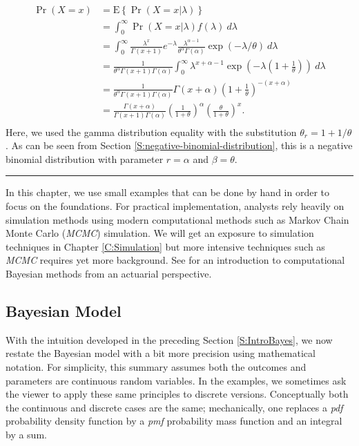 \documentclass[]{book}
\theoremstyle{definition}
\theoremstyle{definition}
\theoremstyle{definition}
\theoremstyle{remark}
\begin{document}
\[
\begin{aligned}
\Pr(X = x) 
&=  \mathrm{E} \left\{\Pr(X = x|\lambda)\right\}\\
&=  \int_0^{\infty} \Pr(X = x|\lambda) f(\lambda) ~d\lambda \\
&=  \int_0^{\infty} \frac{\lambda^x}{\Gamma(x+1)} e^{-\lambda} \frac{\lambda^{\alpha-1}}{\theta^{\alpha}\Gamma(\alpha)}\exp(-\lambda/\theta) ~d\lambda\\
&=  \frac{1}{\theta^{\alpha}\Gamma(x+1)\Gamma(\alpha)} \int_0^{\infty} \lambda^{x+\alpha-1} \exp\left(-\lambda(1+\frac{1}{\theta})\right) ~d\lambda \\
&=  \frac{1}{\theta^{\alpha}\Gamma(x+1)\Gamma(\alpha)} \Gamma(x+\alpha)\left(1+\frac{1}{\theta}\right)^{-(x+\alpha)} \\
&=  \frac{\Gamma(x+\alpha)}{\Gamma(x+1)\Gamma(\alpha)}\left(\frac{1}{1+\theta}\right)^{\alpha} \left(\frac{\theta}{1+\theta}\right)^{x} .\\
\end{aligned} 
\] Here, we used the gamma distribution equality with the substitution
\(\theta_r = 1 + 1/\theta\). As can be seen from Section
\ref{S:negative-binomial-distribution}, this is a negative binomial
distribution with parameter \(r = \alpha\) and \(\beta = \theta\).

\begin{center}\rule{0.5\linewidth}{\linethickness}\end{center}

In this chapter, we use small examples that can be done by hand in order
to focus on the foundations. For practical implementation, analysts rely
heavily on simulation methods using modern computational methods such as
Markov Chain Monte Carlo (\emph{MCMC}) simulation. We will get an
exposure to simulation techniques in Chapter \ref{C:Simulation} but more
intensive techniques such as \emph{MCMC} requires yet more background.
See \citet{hartman2016} for an introduction to computational Bayesian
methods from an actuarial perspective.

\subsection{Bayesian Model}\label{bayesian-model}

With the intuition developed in the preceding Section
\ref{S:IntroBayes}, we now restate the Bayesian model with a bit more
precision using mathematical notation. For simplicity, this summary
assumes both the outcomes and parameters are continuous random
variables. In the examples, we sometimes ask the viewer to apply these
same principles to discrete versions. Conceptually both the continuous
and discrete cases are the same; mechanically, one replaces a
\emph{pdf}{ probability density function} by a \emph{pmf}{ probability
mass function} and an integral by a sum.
\end{document}
